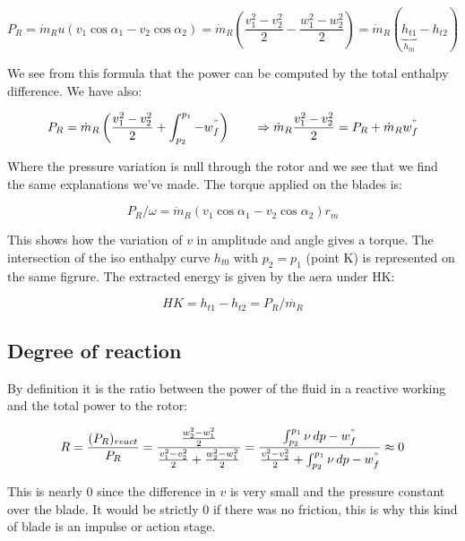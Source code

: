 \begin{equation}
P_R = \dot{m}_R u (v_1\cos \alpha _1 - v_2 \cos \alpha _2) = \dot{m}_R \left(\frac{v_1^2-v_2^2}{2}-\frac{w_1^2-w_2^2}{2}\right) = \dot{m}_R (\underbrace{h_{t1}}_{h_{t0}} - h_{t2})
\end{equation}

We see from this formula that the power can be computed by the total enthalpy difference. We have also: 

\begin{equation}
P_R = \dot{m}_R \left(\frac{v_1^2 -v_2^2}{2} + \int _{p_2}^{p_1} - w^"_f\right) \qquad \Rightarrow \dot{m}_R\frac{v_1^2 -v_2^2}{2} = P_R + \dot{m}_R w^"_f
\end{equation}

Where the pressure variation is null through the rotor and we see that we find the same explanations we've made. The torque applied on the blades is: 

\begin{equation}
P_R/ \omega = \dot{m}_R  (v_1\cos \alpha _1 - v_2 \cos \alpha _2) r_m
\end{equation}

This shows how the variation of $v$ in amplitude and angle gives a torque. The intersection of the iso enthalpy curve $h_{t0}$ with $p_2 = p_1$ (point K) is represented on the same figrure. The extracted energy is given by the aera under HK: 

\begin{equation}
HK = h_{t1} - h_{t2} = P_R/\dot{m_R}
\end{equation}

\subsection{Degree of reaction}
By definition it is the ratio between the power of the fluid in a reactive working and the total power to the rotor: 

\begin{equation}
R= \frac{(P_R)_{react}}{P_R} = \frac{\frac{w_2^2 - w_1^2}{2}}{\frac{v_1^2 - v_2^2}{2}+ \frac{w_2^2 - w_1^2}{2}} = \frac{\int _{p_2}^{p_1}\nu\, dp -w^"_f}{\frac{v_1^2 - v_2^2}{2}+ \int _{p_2}^{p_1}\nu\, dp -w^"_f} \approx 0
\end{equation}

This is nearly 0 since the difference in $v$ is very small and the pressure constant over the blade. It would be strictly 0 if there was no friction, this is why this kind of blade is an impulse or action stage. 

